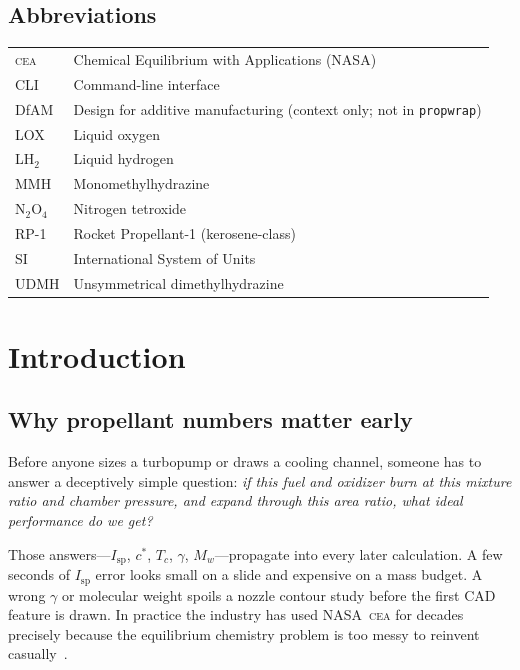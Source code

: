 \documentclass[11pt,a4paper]{report}
\newcommand{\pw}{\texttt{propwrap}}
\newcommand{\cea}{\textsc{cea}}
\newcommand{\Isp}{I_{\mathrm{sp}}}
\newcommand{\cstar}{c^{*}}
\begin{document}
\section*{Abbreviations}
\begin{longtable}{@{}p{2.8cm}p{11.1cm}@{}}
\cea{} & Chemical Equilibrium with Applications (NASA) \\
CLI & Command-line interface \\
DfAM & Design for additive manufacturing (context only; not in \pw{}) \\
LOX & Liquid oxygen \\
LH$_2$ & Liquid hydrogen \\
MMH & Monomethylhydrazine \\
N$_2$O$_4$ & Nitrogen tetroxide \\
RP-1 & Rocket Propellant-1 (kerosene-class) \\
SI & International System of Units \\
UDMH & Unsymmetrical dimethylhydrazine \\
\end{longtable}

\newpage
{}

\chapter{Introduction}

\section{Why propellant numbers matter early}

Before anyone sizes a turbopump or draws a cooling channel, someone has to
answer a deceptively simple question: \emph{if this fuel and oxidizer burn at
this mixture ratio and chamber pressure, and expand through this area ratio,
what ideal performance do we get?}

Those answers---$\Isp$, $\cstar$, $T_c$, $\gamma$, $M_w$---propagate into every later
calculation. A few seconds of $\Isp$ error looks small on a slide and expensive
on a mass budget. A wrong $\gamma$ or molecular weight spoils a nozzle contour
study before the first CAD feature is drawn. In practice the industry has used
NASA~\cea{} for decades precisely because the equilibrium chemistry problem is
too messy to reinvent casually~\citep{gordon1994cea,gordon1996cea}.
\end{document}
